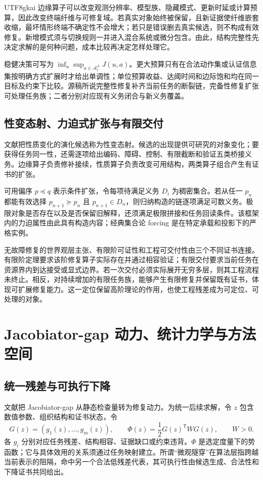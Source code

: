 \documentclass[11pt,a4paper]{article}
\theoremstyle{plain}
\theoremstyle{definition}
\theoremstyle{remark}
\begin{document}
\begin{CJK*}{UTF8}{gkai}
边缘算子可以改变观测分辨率、模型族、隐藏模式、更新时延或计算预算，因此改变终端纤维与可修复域。若真实对象始终被保留，且新证据使纤维嵌套收缩，最坏情形终端不确定性不会增大；若只是错误删去真实候选，则不构成有效修复。新增模式须与切换规则一并进入混合系统或微分包含。由此，结构完整性先决定求解的是何种问题，成本比较再决定怎样处理它。

稳健决策可写为 $\inf_u\sup_{a\in\mathcal A_t^{\Lambda}}J(u,a)$。更大预算只有在合法动作集或认证信息集按明确方式扩展时才给出单调性；单位预算收益、达阈时间和边际饱和均在同一目标及约束下比较。源稿所说完整性修复补齐当前任务的断裂链，完备性修复扩张可处理任务族；二者分别对应现有义务闭合与新义务覆盖。

\subsection{性变态射、力迫式扩张与有限交付}

文献\cite{S29}把性质变化的演化候选称为性变态射。候选的出现提供可研究的对象变化；要获得任务同一性，还需逐项给出编码、障碍、控制、有限截断和验证五类桥接义务。边缘算子负责修补接续，性质算子负责改变可用结构，两类算子组合产生有证书的扩张。

可用偏序 $p\preceq q$ 表示条件扩张，令每项待满足义务 $D_i$ 为稠密集合。若从任一 $p_n$ 都能有效选择 $p_{n+1}\succeq p_n$ 且 $p_{n+1}\in D_n$，则归纳构造的链逐项满足可数义务。极限对象是否存在以及是否保留旧解释，还须满足极限拼接和任务回读条件。该框架内的力迫属性由此具有构造内容；经典集合论 forcing 是在特定承载和投影下的严格实例。

无故障修复的世界观层主张、有限阶可证性和工程可交付性由三个不同证书连接。有限阶定理要求该阶修复算子实际存在并通过相容验证；有限交付要求当前任务在资源界内到达接受或显式边界。若一次交付必须实际展开无穷多层，则其工程流程未终止。相反，对持续增加的有限任务族，能够产生有限修复并保留既有证书，体现可扩展修复能力。这一定位保留高阶理论的作用，也使工程残差成为可定位、可处理的对象。

\section{Jacobiator-gap 动力、统计力学与方法空间}
\label{ss:dynamics}

\subsection{统一残差与可执行下降}

文献\cite{S17}把 Jacobiator-gap 从静态检查量转为修复动力。为统一后续求解，令 $z$ 包含数值参数、组织结构和证书状态，令
\[
 G(z)=(g_1(z),\ldots,g_m(z)),\qquad
 \Phi(z)=\frac12G(z)^{\mathsf T}WG(z),\qquad W>0.
\]
各 $g_i$ 分别对应任务残差、结构相容、证据缺口或约束违背。$\Phi$ 是选定度量下的势函数；它与具体效用的关系须通过任务映射建立。所谓“微观隧穿”在算法层指跨越当前表示的阻隔，命中另一个合法低残差代表，其可执行性由候选生成、合法性和下降证书共同给出。


\end{CJK*}
\end{document}
